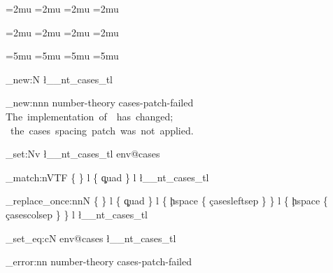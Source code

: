 \usepackage[
  script,
  scriptscript,
  no-inner,
  no-close,
  no-cover
]{innerscript}

\Umathordbinspacing\scriptstyle=2mu
\Umathbinordspacing\scriptstyle=2mu
\Umathordbinspacing\crampedscriptstyle=2mu
\Umathbinordspacing\crampedscriptstyle=2mu

\Umathordrelspacing\scriptstyle=2mu
\Umathrelordspacing\scriptstyle=2mu
\Umathordrelspacing\crampedscriptstyle=2mu
\Umathrelordspacing\crampedscriptstyle=2mu

\Umathopopspacing\displaystyle        =5mu
\Umathopopspacing\crampeddisplaystyle =5mu
\Umathopopspacing\textstyle           =5mu
\Umathopopspacing\crampedtextstyle    =5mu

\setlength{\jot}{5pt}

\newlength{\casesleftsep}
\newlength{\casescolsep}

\setlength{\casesleftsep}{0.2em}
\setlength{\casescolsep}{1.2em}

\ExplSyntaxOn

\tl_new:N \l__nt_cases_tl

\msg_new:nnn { number-theory } { cases-patch-failed }
  {
    The~implementation~of~\string\env@cases~has~changed;
    ~the~cases~spacing~patch~was~not~applied.
  }

  {
    \tl_set:Nv \l__nt_cases_tl { env@cases }

    \regex_match:nVTF
      {
        \cL\@ \cB\{ \cE\} l
        \cL\@ \cB\{ \c{quad} \cE\} l
      }
      \l__nt_cases_tl
      {
        \regex_replace_once:nnN
          {
            \cL\@ \cB\{ \cE\} l
            \cL\@ \cB\{ \c{quad} \cE\} l
          }
          {
            \cL\@ \cB\{
              \c{hspace} \cB\{ \c{casesleftsep} \cE\}
            \cE\} l
            \cL\@ \cB\{
              \c{hspace} \cB\{ \c{casescolsep} \cE\}
            \cE\} l
          }
          \l__nt_cases_tl

        \cs_set_eq:cN { env@cases } \l__nt_cases_tl
      }
      {
        \msg_error:nn
          { number-theory }
          { cases-patch-failed }
      }
  }

\ExplSyntaxOff

